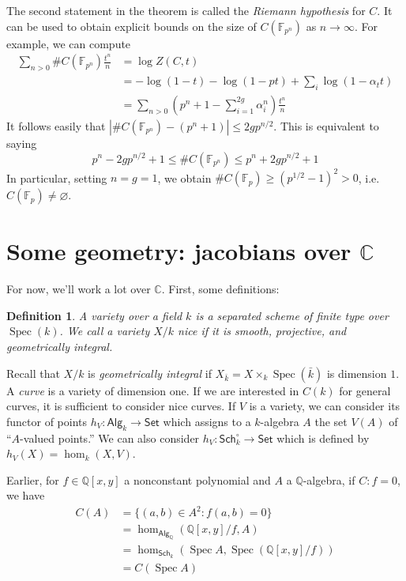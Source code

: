 \documentclass{article}
\DeclareMathOperator{\spec}{Spec}
\newtheorem{definition}[subsection]{Definition}
\theoremstyle{definition}
\begin{document}
The second statement in the theorem is called the \emph{Riemann hypothesis} 
for $C$. It can be used to obtain explicit bounds on the size of 
$C(\mathbb{F}_{p^n})$ as $n\to\infty$. For example, we can compute 
\begin{align*}
  \sum_{n>0} \# C(\mathbb{F}_{p^n}) \frac{t^n}{n} 
    &= \log Z(C,t) \\
    &= -\log(1-t) - \log(1-p t) + \sum_i \log(1-\alpha_t t) \\
    &= \sum_{n>0} \left(p^n+1-\sum_{i=1}^{2 g} \alpha_i^n\right) \frac{t^n}{n}
\end{align*}
It follows easily that 
$|\# C(\mathbb{F}_{p^n})-(p^n+1)| \leqslant 2 g p^{n/2}$. This is equivalent 
to saying 
\[
  p^n-2 g p^{n/2}+1 \leqslant \# C(\mathbb{F}_{p^n}) \leqslant p^n + 2 g p^{n/2} + 1
\]
In particular, setting $n = g = 1$, we obtain 
$\# C(\mathbb{F}_p) \geqslant (p^{1/2}-1)^2>0$, i.e. 
$C(\mathbb{F}_p)\ne\varnothing$. 











\section{Some geometry: jacobians over $\mathbb{C}$}

For now, we'll work a lot over $\mathbb{C}$. First, some definitions:

\begin{definition}
A \emph{variety} over a field $k$ is a separated scheme of finite type over 
$\spec(k)$. We call a variety $X/k$ \emph{nice} if it is smooth, projective, 
and geometrically integral.
\end{definition}

Recall that $X/k$ is \emph{geometrically integral} if 
$X_{\bar k}=X\times_k \spec(\bar k)$ is dimension $1$. A \emph{curve} is a 
variety of dimension one. If we are interested in $C(k)$ for general curves, 
it is sufficient to consider nice curves. If $V$ is a variety, we can consider 
its functor of points $h_V:\mathsf{Alg}_k\to \mathsf{Set}$ which assigns to a 
$k$-algebra $A$ the set $V(A)$ of ``$A$-valued points.'' We can also consider 
$h_V:\mathsf{Sch}_k^\circ\to\mathsf{Set}$ which is defined by 
$h_V(X)=\hom_k(X,V)$. 

Earlier, for $f\in \mathbb{Q}[x,y]$ a nonconstant polynomial and $A$ a 
$\mathbb{Q}$-algebra, if $C:f=0$, we have 
\begin{align*}
  C(A) &= \{(a,b)\in A^2:f(a,b) = 0\} \\
    &= \hom_{\mathsf{Alg}_\mathbb{Q}}(\mathbb{Q}[x,y]/f,A) \\
    &= \hom_{\mathsf{Sch}_k}\left(\spec A,\spec(\mathbb{Q}[x,y]/f)\right) \\
    &= C(\spec A)
\end{align*}
\end{document}
